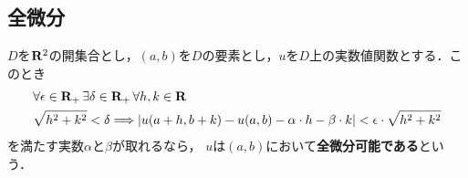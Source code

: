 \subsection{全微分}
	\begin{screen}
		\begin{dfn}[全微分]\label{def:totally_differentiability}
			$D$を$\mathbf{R}^2$の開集合とし，$(a,b)$を$D$の要素とし，$u$を$D$上の実数値関数とする．このとき
			\begin{align}
				&\forall \epsilon \in \mathbf{R}_+\, \exists \delta \in \mathbf{R}_+\, \forall h,k \in \mathbf{R}\, \\
				&\sqrt{h^2 + k^2} < \delta \Longrightarrow
				\left|u(a+h,b+k) - u(a,b) - \alpha \cdot h - \beta \cdot k\right| 
				< \epsilon \cdot \sqrt{h^2 + k^2}
				\label{fom:def_totally_differentiability}
			\end{align}
			を満たす実数$\alpha$と$\beta$が取れるなら，
			$u$は$(a,b)$において{\bf 全微分可能である}という．
		\end{dfn}
	\end{screen}
	
